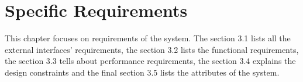 \chapter{Specific Requirements}

This chapter focuses on requirements of the system. The section 3.1 lists all the external interfaces' requirements, the section 3.2 lists the functional requirements, the section 3.3 tells about performance requirements, the section 3.4 explains the design constraints and the final section 3.5 lists the attributes of the system.





